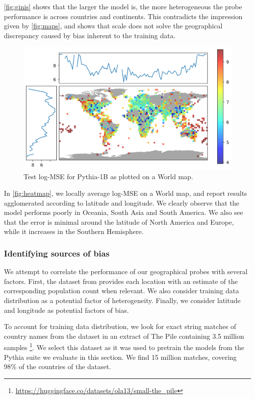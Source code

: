 \autoref{fig:ginis} shows that the larger the model is, the more heterogeneous the probe performance is across countries and continents. This contradicts the impression given by \autoref{fig:maps}, and shows that scale does not solve the geographical discrepancy caused by bias inherent to the training data.

\begin{figure}
    \centering
    \includegraphics[width=0.9\linewidth]{sources/part_1/geographical/imgs/heatmap_100_50.png}
    \caption{Test log-MSE for Pythia-1B as plotted on a World map.}
    \label{fig:heatmap}
\end{figure}

In \autoref{fig:heatmap}, we locally average log-MSE on a World map, and report results agglomerated according to latitude and longitude. We clearly observe that the model performs poorly in Oceania, South Asia and South America. We also see that the error is minimal around the latitude of North America and Europe, while it increases in the Southern Hemisphere.

\subsubsection{Identifying sources of bias}
We attempt to correlate the performance of our geographical probes with several factors. First, the dataset from \citep{gurnee2023language} provides each location with an estimate of the corresponding population count when relevant. We also consider training data distribution as a potential factor of heterogeneity. Finally, we consider latitude and longitude as potential factors of bias.


To account for training data distribution, we look for exact string matches of country names from the \citet{gurnee2023language} dataset in an extract of The Pile \citep{gao2020pile} containing 3.5 million samples \footnote{\url{https://huggingface.co/datasets/ola13/small-the\_pile}}. We select this dataset as it was used to pretrain the models from the Pythia suite \citep{pythia} we evaluate in this section. We find 15 million matches, covering 98\% of the countries of the dataset.


